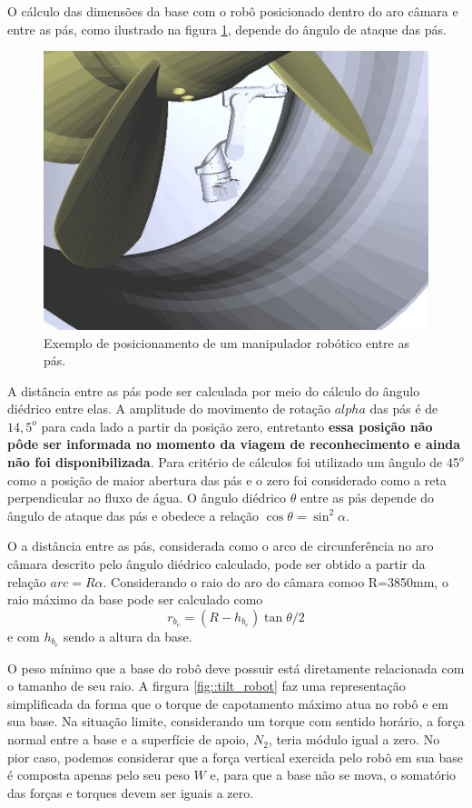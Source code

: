 O cálculo das dimensões da base com o robô posicionado dentro do aro câmara e
entre as pás, como ilustrado na figura \ref{fig::robot_between}, depende do
ângulo de ataque das pás.

\begin{figure}[h!]
\centering
	\includegraphics[width=0.9\columnwidth]{sota/figs/openrave/robot_between_openrave.jpg}
	\caption{Exemplo de posicionamento de um manipulador robótico entre as pás.}
	\label{fig::robot_between}
\end{figure}
A distância entre as pás pode ser calculada por meio do cálculo do ângulo diédrico entre elas. A amplitude do movimento de rotação $alpha$ 
das pás é de $14,5^o$ para cada lado a partir da posição zero, entretanto \textbf{essa posição não pôde ser
informada no momento da viagem de reconhecimento e ainda não foi
disponibilizada}. Para critério de cálculos foi utilizado um ângulo de
$45^o$ como a posição de maior abertura das pás e o zero foi considerado como
a reta perpendicular ao fluxo de água. O ângulo diédrico $\theta$ entre as pás
depende do ângulo de ataque das pás e obedece a relação $\cos{\theta} =
\sin^2{\alpha}.$

O a distância entre as pás, considerada como o arco de circunferência no aro
câmara descrito pelo ângulo diédrico calculado, pode ser obtido a partir da
relação $arc=R\alpha$.
Considerando o raio do aro do câmara comoo R=3850mm, o raio máximo da base pode
ser calculado como $$r_{b_e} = (R - h_{b_e})\tan{\theta/2}$$ e com $h_{b_e}$
sendo a altura da base.

O peso mínimo que a base do robô deve possuir está diretamente relacionada com o
tamanho de seu raio. A firgura \ref{fig::tilt_robot} faz uma representação
simplificada da forma que o torque de capotamento máximo atua no robô e em sua
base. Na situação limite, considerando um torque com sentido horário, a força
normal entre a base e a superfície de apoio, $N_2$, teria módulo igual a zero.
No pior caso, podemos considerar que a força vertical exercida pelo robô em sua
base é composta apenas pelo seu peso $W$ e, para que a base não se mova, o
somatório das forças e torques devem ser iguais a zero.

